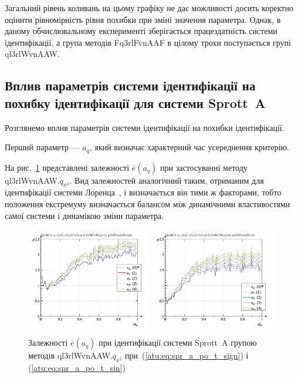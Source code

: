 Загальний рівень коливань на цьому графіку не дає можливості
досить коректно оцінити рівномірність рівня похибки при
зміні значення параметра. Однак, в даному обчислювальному
експерименті зберігається працездатність системи
ідентифікації, а група методів Fq3rlFvnAAF в цілому трохи
поступається групі ql3rlWvnAAW.




\subsection{Вплив параметрів системи ідентифікації на похибку ідентифікації для системи Sprott~A} %


Розглянемо вплив параметрів системи ідентифікації на похибки
ідентифікації.

Перший параметр ---
$ a_q $, який визначає характерний час усереднення критерію.

На рис.~\ref{atu:f:spr_a_a_q_ql3rlWvnAAW_q_x2} представлені залежності
$ \overline{e} (a_q) $ при застосуванні методу ql3rlWvnAAW.$q_{x^2} $. Вид залежностей аналогічний таким, отриманим для
ідентифікації системи Лоренца~\cite{atu_kher2015}, і визначається він
тими ж факторами, тобто положення екстремуму визначається
балансом між динамічними властивостями самої системи і
динамікою зміни параметра.


\begin{figure}[htb!]
  \centerline{
    \includegraphics[width=0.49\textwidth]{p/cha/spr_a/ql3rlWvnAAW_x2/sprott_a_id-p_a_q_sign.png}
    \hfill
    \includegraphics[width=0.49\textwidth]{p/cha/spr_a/ql3rlWvnAAW_x2/sprott_a_id-p_a_q_sin.png}
  }
\caption{Залежності $ \overline{e} (a_q) $ при ідентифікації системи Sprott~A групою методів ql3rlWvnAAW.$q_{x^2} $ при~(\ref{atu:eq:spr_a_po_t_sign}) і (\ref{atu:eq:spr_a_po_t_sin})}
  \label{atu:f:spr_a_a_q_ql3rlWvnAAW_q_x2}
\end{figure}


